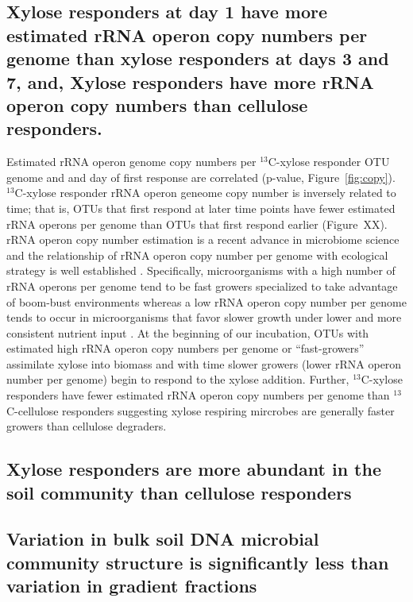 \subsection{Xylose responders at day 1 have more estimated rRNA operon copy numbers per genome
than xylose responders at days 3 and 7, and, Xylose responders have more rRNA operon copy numbers
than cellulose responders.}
Estimated rRNA operon genome copy numbers per $^{13}$C-xylose responder OTU
genome and and day of first response are correlated (p-value,
Figure~\ref{fig:copy}). $^{13}$C-xylose responder rRNA operon geneome copy
number is inversely related to time; that is, OTUs that first respond at later
time points have fewer estimated rRNA operons per genome than OTUs that first
respond earlier (Figure~XX). rRNA operon copy number estimation is a recent advance in
microbiome science \citep{Kembel_2012} and the relationship of rRNA operon copy
number per genome with ecological strategy is well established
\citep{Klappenbach_2000}. Specifically, microorganisms with a high number of
rRNA operons per genome tend to be fast growers specialized to take advantage
of boom-bust environments whereas a low rRNA operon copy number per genome
tends to occur in microorganisms that favor slower growth under lower and more
consistent nutrient input \citep{Klappenbach_2000}. At the beginning of our
incubation, OTUs with estimated high rRNA operon copy numbers per genome or
``fast-growers'' assimilate xylose into biomass and with time slower growers
(lower rRNA operon number per genome) begin to respond to the xylose addition.
Further, $^{13}$C-xylose responders have fewer estimated rRNA operon copy
numbers per genome than $^{13}$C-cellulose responders suggesting xylose
respiring mircrobes are generally faster growers than cellulose degraders.

\subsection{Xylose responders are more abundant in the soil community than cellulose
responders}

\subsection{Variation in bulk soil DNA microbial community structure is significantly less
than variation in gradient fractions} 
